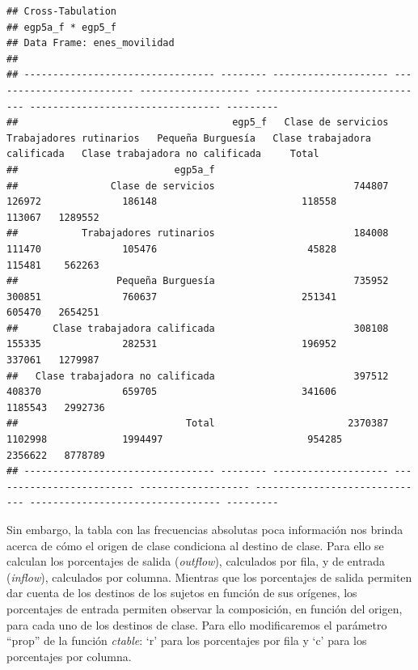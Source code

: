 \documentclass[
]{book}
\begin{document}
\begin{verbatim}
## Cross-Tabulation  
## egp5a_f * egp5_f  
## Data Frame: enes_movilidad  
## 
## --------------------------------- -------- -------------------- ------------------------- ------------------- ------------------------------ --------------------------------- ---------
##                                     egp5_f   Clase de servicios   Trabajadores rutinarios   Pequeña Burguesía   Clase trabajadora calificada   Clase trabajadora no calificada     Total
##                           egp5a_f                                                                                                                                                       
##                Clase de servicios                        744807                    126972              186148                         118558                            113067   1289552
##           Trabajadores rutinarios                        184008                    111470              105476                          45828                            115481    562263
##                 Pequeña Burguesía                        735952                    300851              760637                         251341                            605470   2654251
##      Clase trabajadora calificada                        308108                    155335              282531                         196952                            337061   1279987
##   Clase trabajadora no calificada                        397512                    408370              659705                         341606                           1185543   2992736
##                             Total                       2370387                   1102998             1994497                         954285                           2356622   8778789
## --------------------------------- -------- -------------------- ------------------------- ------------------- ------------------------------ --------------------------------- ---------
\end{verbatim}

Sin embargo, la tabla con las frecuencias absolutas poca información nos brinda acerca de cómo el origen de clase condiciona al destino de clase. Para ello se calculan los porcentajes de salida (\emph{outflow}), calculados por fila, y de entrada (\emph{inflow}), calculados por columna. Mientras que los porcentajes de salida permiten dar cuenta de los destinos de los sujetos en función de sus orígenes, los porcentajes de entrada permiten observar la composición, en función del origen, para cada uno de los destinos de clase. Para ello modificaremos el parámetro ``prop'' de la función \emph{ctable}: `r' para los porcentajes por fila y `c' para los porcentajes por columna.
\end{document}
